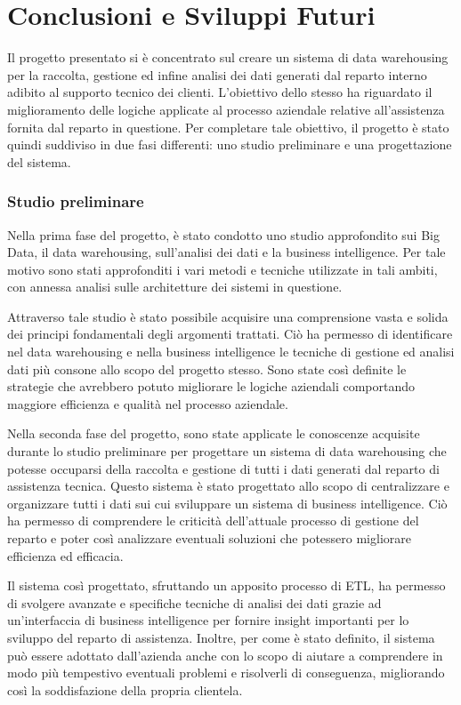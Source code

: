 \chapter{Conclusioni e Sviluppi Futuri}
Il progetto presentato si è concentrato sul creare un sistema di data warehousing per la raccolta, gestione ed infine analisi dei dati generati dal reparto interno adibito al supporto tecnico dei clienti. L'obiettivo dello stesso ha riguardato il miglioramento delle logiche applicate al processo aziendale relative all'assistenza fornita dal reparto in questione. Per completare tale obiettivo, il progetto è stato quindi suddiviso in due fasi differenti: uno studio preliminare e una progettazione del sistema.

\subsection{Studio preliminare}

Nella prima fase del progetto, è stato condotto uno studio approfondito sui Big Data, il data warehousing, sull'analisi dei dati e la business intelligence. Per tale motivo sono stati approfonditi i vari metodi e tecniche utilizzate in tali ambiti, con annessa analisi sulle architetture dei sistemi in questione.

Attraverso tale studio è stato possibile acquisire una comprensione vasta e solida dei principi fondamentali degli argomenti trattati. Ciò ha permesso di identificare nel data warehousing e nella business intelligence le tecniche di gestione ed analisi dati più consone allo scopo del progetto stesso. Sono state così definite le strategie che avrebbero potuto migliorare le logiche aziendali comportando maggiore efficienza e qualità nel processo aziendale. 


Nella seconda fase del progetto, sono state applicate le conoscenze acquisite durante lo studio preliminare per progettare un sistema di data warehousing che potesse occuparsi della raccolta e gestione di tutti i dati generati dal reparto di assistenza tecnica. Questo sistema è stato progettato allo scopo di centralizzare e organizzare tutti i dati sui cui sviluppare un sistema di business intelligence. Ciò ha permesso di comprendere le criticità dell'attuale processo di gestione del reparto e poter così analizzare eventuali soluzioni che potessero migliorare efficienza ed efficacia.

Il sistema così progettato, sfruttando un apposito processo di ETL, ha permesso di svolgere avanzate e specifiche tecniche di analisi dei dati grazie ad un'interfaccia di business intelligence per fornire insight importanti per lo sviluppo del reparto di assistenza. Inoltre, per come è stato definito, il sistema può essere adottato dall'azienda anche con lo scopo di aiutare a comprendere in modo più tempestivo eventuali problemi e risolverli di conseguenza, migliorando così la soddisfazione della propria clientela.

